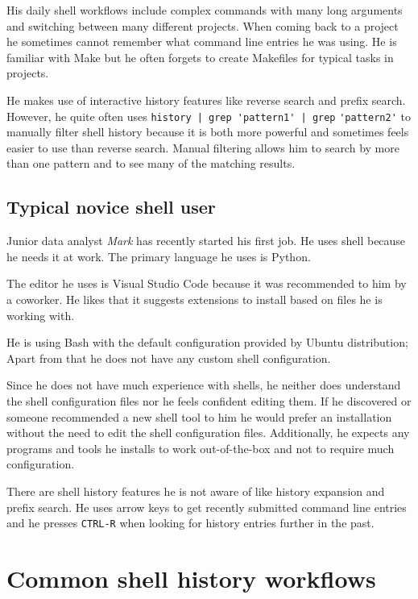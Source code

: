 His daily shell workflows include complex commands with many long arguments and switching between many different projects. When coming back to a project he sometimes cannot remember what command line entries he was using. He is familiar with Make but he often forgets to create Makefiles for typical tasks in projects.

He makes use of interactive history features like reverse search and prefix search. However, he quite often uses \verb#history | grep 'pattern1' | grep# \verb#'pattern2'# to manually filter shell history because it is both more powerful and sometimes feels easier to use than reverse search. Manual filtering allows him to search by more than one pattern and to see many of the matching results. 


\subsection{Typical novice shell user}

Junior data analyst \textit{Mark} has recently started his first job. He uses shell because he needs it at work. The primary language he uses is Python. 

The editor he uses is Visual Studio Code because it was recommended to him by a coworker. He likes that it suggests extensions to install based on files he is working with.

He is using Bash with the default configuration provided by Ubuntu distribution; Apart from that he does not have any custom shell configuration. 

Since he does not have much experience with shells, he neither does understand the shell configuration files nor he feels confident editing them. If he discovered or someone recommended a new shell tool to him he would prefer an installation without the need to edit the shell configuration files. Additionally, he expects any programs and tools he installs to work out-of-the-box and not to require much configuration. 

There are shell history features he is not aware of like history expansion and prefix search. He uses arrow keys to get recently submitted command line entries and he presses \verb|CTRL-R| when looking for history entries further in the past. 



\section{Common shell history workflows}

